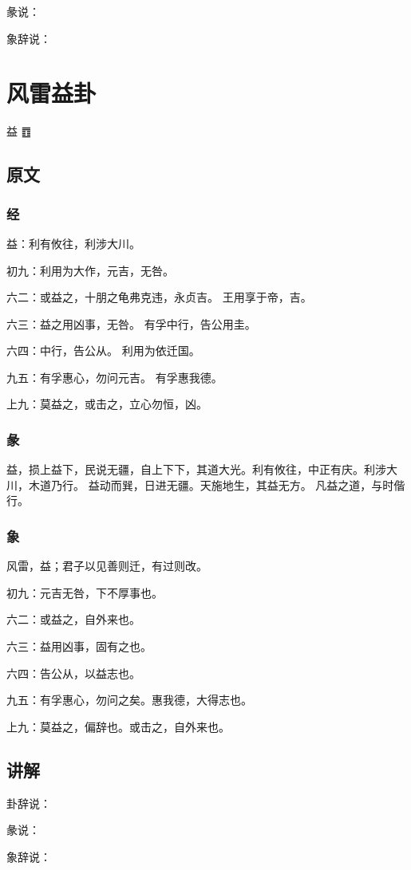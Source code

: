 \documentclass[12pt,oneside]{book}
\begin{document}
彖说：

象辞说：

\chapter{风雷益卦}
益 {\Large ䷩}
\section{原文}

\subsection{经}
益：利有攸往，利涉大川。

初九：利用为大作，元吉，无咎。

六二：或益之，十朋之龟弗克违，永贞吉。 王用享于帝，吉。

六三：益之用凶事，无咎。 有孚中行，告公用圭。

六四：中行，告公从。 利用为依迁国。

九五：有孚惠心，勿问元吉。 有孚惠我德。

上九：莫益之，或击之，立心勿恒，凶。

\subsection{彖}
益，损上益下，民说无疆，自上下下，其道大光。利有攸往，中正有庆。利涉大川，木道乃行。 益动而巽，日进无疆。天施地生，其益无方。 凡益之道，与时偕行。

\subsection{象}
风雷，益；君子以见善则迁，有过则改。

初九：元吉无咎，下不厚事也。

六二：或益之，自外来也。

六三：益用凶事，固有之也。

六四：告公从，以益志也。

九五：有孚惠心，勿问之矣。惠我德，大得志也。

上九：莫益之，偏辞也。或击之，自外来也。

\section{讲解}
卦辞说：

彖说：

象辞说：
\end{document}

